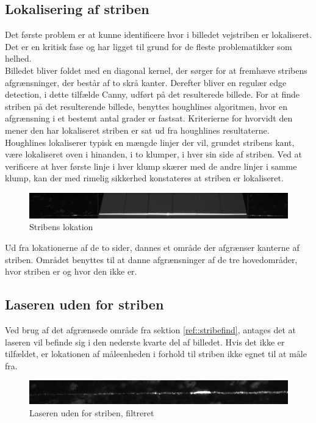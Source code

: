 \subsection{Lokalisering af striben\label{ref::stribefind}}
Det første problem er at kunne identificere hvor i billedet vejstriben er lokaliseret. Det er en kritisk fase og har ligget til grund for de fleste problematikker som helhed.
\\
Billedet bliver foldet med en diagonal kernel, der sørger for at fremhæve stribens afgrænsninger, der består af to skrå kanter.
Derefter bliver en regulær edge detection, i dette tilfælde Canny, udført på det resulterede billede. For at finde striben på det resulterende billede, benyttes houghlines algoritmen, hvor en afgrænsning i et bestemt antal grader er fastsat. Kriterierne for hvorvidt den mener den har lokaliseret striben er sat ud fra houghlines resultaterne. Houghlines lokaliserer typisk en mængde linjer der vil, grundet stribens kant, være lokaliseret oven i hinanden, i to klumper, i hver sin side af striben.
Ved at verificere at hver første linje i hver klump skærer med de andre linjer i samme klump, kan der med rimelig sikkerhed konstateres at striben er lokaliseret.
\\
\begin{figure}[h]
	\centering
	\includegraphics[width=0.8\linewidth]{Billeder/_1_normal}
	\caption{Stribens lokation}
	\label{fig:1normal}
\end{figure}

Ud fra lokationerne af de to sider, dannes et område der afgrænser kanterne af striben. Området benyttes til at danne afgrænsninger af de tre hovedområder, hvor striben er og hvor den ikke er.

\newpage

\subsection{Laseren uden for striben}

Ved brug af det afgrænsede område fra sektion \ref{ref::stribefind}, antages det at laseren vil befinde sig i den nederste kvarte del af billedet. Hvis det ikke er tilfældet, er lokationen af måleenheden i forhold til striben ikke egnet til at måle fra.
\begin{figure}[h]
	\centering
	\includegraphics[width=0.7\linewidth]{Billeder/base_1_filter}
	\caption{Laseren uden for striben, filtreret}
	\label{fig:base_1_filter}
\end{figure}

